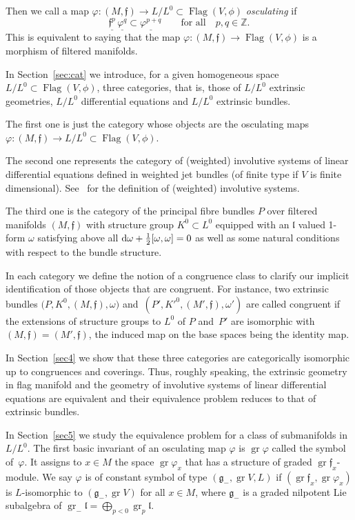 \documentclass[10pt,a4paper]{amsart}
\newcommand{\f}{\mathfrak f}
\newcommand{\g}{\mathfrak g}
\newcommand{\lf}{\mathfrak l}
\newcommand{\Flag}{\operatorname{Flag}}
\newcommand{\gr}{\operatorname{gr}}
\numberwithin{equation}{section}
\begin{document}
Then we call a map $\varphi \colon (M, \mathfrak f ) \to L/L^0 \subset \Flag(V, \phi)$ \emph{osculating} if
\[
\underline{\f^p }\,\underline{\varphi^q }
\subset \underline{\varphi^{p+q} }\qquad \text {for all}\quad p, q \in \mathbb Z.
\]
This is equivalent to saying that the map $\varphi\colon(M, \mathfrak f ) \to \Flag(V, \phi)$ is a morphism of filtered manifolds.


In Section~\ref{sec:cat} we introduce, for a given homogeneous space $L/L^0 \subset \Flag(V, \phi) $, three categories, that is, those of $L/L^0$ extrinsic geometries, $L/L^0$ differential equations and $L/L^0$ extrinsic bundles.

The first one is just the category whose objects are the osculating maps $\varphi\colon (M, \mathfrak f) \to L/L^0 \subset \Flag(V, \phi )$.

The second one represents the category of (weighted) involutive systems of linear differential equations defined in weighted jet bundles (of finite type if $V$ is finite dimensional). See~\cite{Mor2002} for the definition of (weighted) involutive systems.

The third one is the category of the principal fibre bundles $P$ over filtered manifolds $(M, \f )$ with structure group $K^0 \subset L^0$ equipped with an $\mathfrak l$ valued 1-form $\omega$ satisfying above all ${\rm d}\omega + \frac 12 [\omega, \omega] = 0$ as well as some natural conditions with respect to the bundle structure.

In each category we define the notion of a congruence class to clarify our implicit identification of those objects that are congruent.
For instance, two extrinsic bundles $\big(P, K^0, (M, \f), \omega\big)$ and~$(P', K'^0, (M', \f), \omega ')$ are called congruent if the extensions of structure groups to $L^0$ of $P$ and~$P'$ are isomorphic with $(M, \f)=(M', \f)$, the induced map on the base spaces being the identity map.

In Section~\ref{sec4} we show that these three categories are categorically isomorphic up to congruences and coverings.
Thus, roughly speaking, the extrinsic geometry in flag manifold and the geometry of involutive systems of linear differential equations are equivalent and their equivalence problem reduces to that of extrinsic bundles.

In Section~\ref{sec5} we study the equivalence problem for a class of submanifolds in $L/L^0$. The first basic invariant of an osculating map $\varphi$ is $\gr\varphi$ called the symbol of~$\varphi$. It assigns to $x \in M$ the space $\gr\varphi_x $ that has a structure of graded $\gr\f_x$-module. We say $\varphi$ is of constant symbol of type $(\g_-, \gr V, L)$ if $(\gr\f_x, \gr\varphi _x)$ is $L$-isomorphic to $ (\g_-, \gr V)$ for all $x \in M$, where $\g_-$ is a graded nilpotent Lie subalgebra of $\gr_- \lf = \bigoplus_{p <0} \gr_p \lf$.
\end{document}
